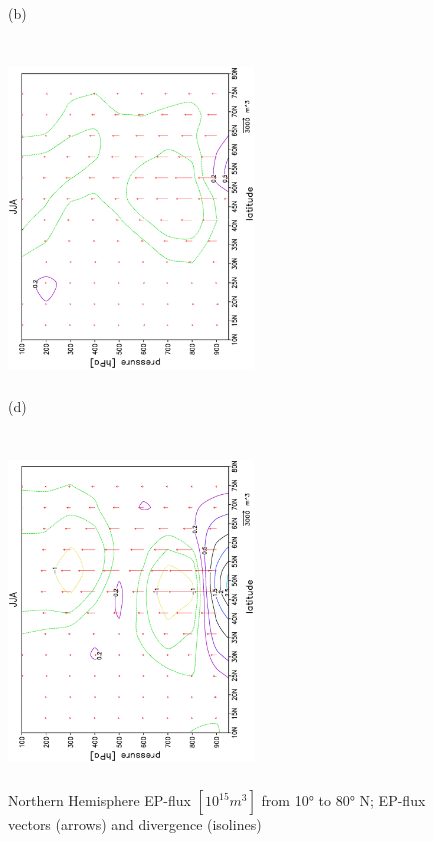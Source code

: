 \documentclass[12pt,a4paper,twoside,openright,headinclude,liststotoc,bibtotoc]{scrreprt}
\begin{document}
\begin{figure}[c]
{}
\parbox{8.5cm}{\hspace{0.90cm}\begin{scriptsize}(b)\end{scriptsize} \vspace{-0.5cm} \\
\includegraphics[height=8.5cm,width=6.5cm,angle=-90]
{eps/epjja.eps}
}
\parbox{8.5cm}{\hspace{0.90cm}\begin{scriptsize}(d)\end{scriptsize} \vspace{-0.5cm} \\
\includegraphics[height=8.5cm,width=6.5cm,angle=-90]
{eps/epjja_era40.eps}
}
\caption[EP-flux Northern Hemisphere for DJF and JJA]{Northern Hemisphere EP-flux $[10^{15} m^{3}]$ from 10° to 80° N; EP-flux vectors (arrows) and divergence (isolines)}
\label{img:ep}
\end{figure}
\end{document}
